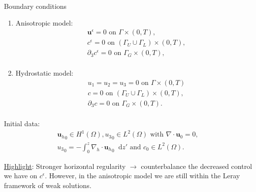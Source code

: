 \documentclass{beamer}
\newcommand*\diff{\mathop{}\!\mathrm{d}}
\begin{document}
\begin{frame}{Boundary conditions}

\begin{enumerate}
\item Anisotropic model:
    \begin{equation} \nonumber
      \begin{split}
        & \mathbf{u}^\epsilon = 0 \text{ on } \Gamma \times (0,T), \\
        & c^\epsilon = 0 \text{ on } ( \Gamma_U \cup \Gamma_L) \times (0,T), \\
        & \partial_3 c^\epsilon = 0 \text{ on } \Gamma_G \times (0,T), \\
      \end{split}
    \end{equation}
\item Hydrostatic model:
    \begin{equation} \nonumber
      \begin{split} 
        & u_1 = u_2 = u_3 = 0 \text{ on } \Gamma \times (0,T) \\
        & c = 0 \text{ on } ( \Gamma_U \cup \Gamma_L) \times (0,T), \\
        & \partial_3 c = 0 \text{ on } \Gamma_G \times (0,T). \\
      \end{split}
    \end{equation}
\end{enumerate}
\end{frame}

\begin{frame}
Initial data:
\begin{equation}
\begin{gathered}\nonumber
{\mathbf{u}_h}_0 \in H^1 (\Omega), {u_3}_0 \in L^2(\Omega) \text{ with } \nabla \cdot \mathbf{u}_0 = 0,\\
{u_3}_0 = - \int_0^z \nabla_h \cdot {\mathbf{u}_h}_0 \diff z' \text{ and } c_0 \in L^2 (\Omega).
\end{gathered}
\end{equation}

\underline{Highlight}: Stronger horizontal regularity $\to$ counterbalance the decreased control we have on $c^\epsilon.$ However, in the anisotropic model we are still within the Leray framework of weak solutions.
\end{frame}
\end{document}

